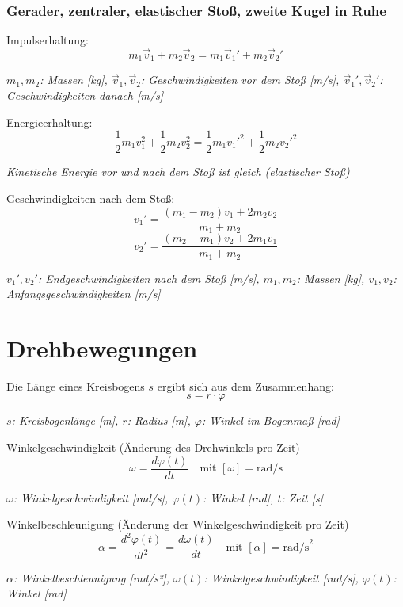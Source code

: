 \documentclass[a4paper,10pt]{article}
\newenvironment{displayformula}
{
	\begin{framed}
		\color{formulaColor}
	}
	{\end{framed}}
\newcommand{\formulalegend}[1]{%
	\par\vspace{0.5ex}%
	{{\color{legendColor}\RaggedRight\small\textit{#1}}}%
	\par\vspace{1.5ex}%
}
\begin{document}
\subsubsection{Gerader, zentraler, elastischer Stoß, zweite Kugel in Ruhe}

\begin{displayformula}
	Impulserhaltung:
	\[
	m_1 \vec{v}_1 + m_2 \vec{v}_2 = m_1 \vec{v}_1' + m_2 \vec{v}_2'
	\]
\end{displayformula}
\formulalegend{
	\( m_1, m_2 \): Massen [kg], \( \vec{v}_1, \vec{v}_2 \): Geschwindigkeiten vor dem Stoß [m/s], \( \vec{v}_1', \vec{v}_2' \): Geschwindigkeiten danach [m/s]
}

\begin{displayformula}
	Energieerhaltung:
	\[
	\frac{1}{2} m_1 v_1^2 + \frac{1}{2} m_2 v_2^2 = \frac{1}{2} m_1 {v_1'}^2 + \frac{1}{2} m_2 {v_2'}^2
	\]
\end{displayformula}
\formulalegend{
	Kinetische Energie vor und nach dem Stoß ist gleich (elastischer Stoß)
}

\begin{displayformula}
	Geschwindigkeiten nach dem Stoß:
	\[
	v_1' = \frac{(m_1 - m_2) v_1 + 2 m_2 v_2}{m_1 + m_2}
	\]
	\[
	v_2' = \frac{(m_2 - m_1) v_2 + 2 m_1 v_1}{m_1 + m_2}
	\]
\end{displayformula}
\formulalegend{
	\( v_1', v_2' \): Endgeschwindigkeiten nach dem Stoß [m/s], \( m_1, m_2 \): Massen [kg], \( v_1, v_2 \): Anfangsgeschwindigkeiten [m/s]
}

\section{Drehbewegungen}

\begin{displayformula}
	Die Länge eines Kreisbogens \( s \) ergibt sich aus dem Zusammenhang:
	\[
	s = r \cdot \varphi 
	\]
\end{displayformula}
\formulalegend{
	\( s \): Kreisbogenlänge [m], \( r \): Radius [m], \( \varphi \): Winkel im Bogenmaß [rad]
}

\begin{displayformula}
	Winkelgeschwindigkeit (Änderung des Drehwinkels pro Zeit)
	\[
	\omega = \frac{d\varphi(t)}{dt} \quad \text{mit } [\omega] = \text{rad/s}
	\]
\end{displayformula}
\formulalegend{
	\( \omega \): Winkelgeschwindigkeit [rad/s], \( \varphi(t) \): Winkel [rad], \( t \): Zeit [s]
}

\begin{displayformula}
	Winkelbeschleunigung (Änderung der Winkelgeschwindigkeit pro Zeit)
	\[
	\alpha = \frac{d^2 \varphi(t)}{dt^2} = \frac{d\omega(t)}{dt} \quad \text{mit } [\alpha] = \text{rad/s}^2
	\]
\end{displayformula}
\formulalegend{
	\( \alpha \): Winkelbeschleunigung [rad/s²], \( \omega(t) \): Winkelgeschwindigkeit [rad/s], \( \varphi(t) \): Winkel [rad]
}
\end{document}
